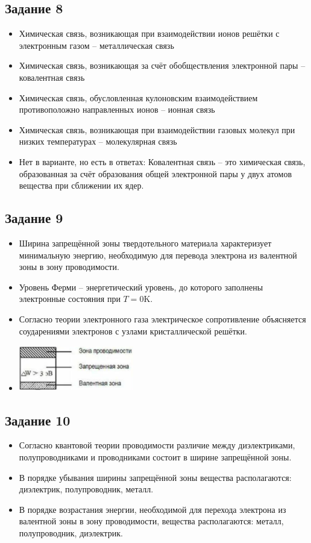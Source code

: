\documentclass[../main.tex]{subfiles}
\begin{document}
\subsection{Задание 8}
\begin{itemize}
    \item Химическая связь, возникающая при взаимодействии ионов решётки с электронным газом – металлическая связь
    \item Химическая связь, возникающая за счёт обобществления электронной пары – ковалентная связь
    \item Химическая связь, обусловленная кулоновским взаимодействием противоположно направленных ионов – ионная связь
    \item Химическая связь, возникающая при взаимодействии газовых молекул при низких температурах – молекулярная связь
    \item Нет в варианте, но есть в ответах: Ковалентная связь – это химическая связь, образованная за счёт образования общей электронной пары у двух атомов вещества при сближении их ядер.
\end{itemize}

\subsection{Задание 9}
\begin{itemize}
    \item Ширина запрещённой зоны твердотельного материала характеризует минимальную энергию, необходимую для перевода электрона из валентной зоны в зону проводимости.
    \item Уровень Ферми -- энергетический уровень, до которого заполнены электронные состояния при $T = 0$K.
    \item Согласно теории электронного газа электрическое сопротивление объясняется соударениями электронов с узлами кристаллической решётки.
    \item \includegraphics[width=5cm, height=2cm]{../img/test1_9.png}
\end{itemize}

\subsection{Задание 10}
\begin{itemize}
    \item Согласно квантовой теории проводимости различие между диэлектриками, полупроводниками и проводниками состоит в ширине запрещённой зоны.
    \item В порядке убывания ширины запрещённой зоны вещества располагаются: диэлектрик, полупроводник, металл.
    \item В порядке возрастания энергии, необходимой для перехода электрона из валентной зоны в зону проводимости, вещества располагаются: металл, полупроводник, диэлектрик.
\end{itemize}
\end{document}
